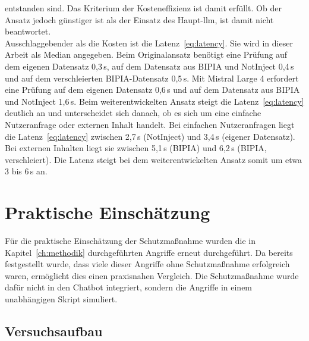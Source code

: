 entstanden sind. Das Kriterium der Kosteneffizienz ist damit erfüllt. Ob der Ansatz jedoch günstiger ist als der Einsatz des Haupt-\ac{llm}, ist damit nicht 
beantwortet. \\
Ausschlaggebender als die Kosten ist die Latenz~\eqref{eq:latency}. Sie wird in dieser Arbeit als Median angegeben. Beim Originalansatz benötigt eine Prüfung auf dem eigenen 
Datensatz 0,3\,s, auf dem Datensatz aus BIPIA und NotInject 0,4\,s und auf dem verschleierten BIPIA-Datensatz 0,5\,s. Mit Mistral Large 4 erfordert eine Prüfung
auf dem eigenen Datensatz 0,6\,s und auf dem Datensatz aus BIPIA und NotInject 1,6\,s.
Beim weiterentwickelten Ansatz steigt die Latenz~\eqref{eq:latency} deutlich an und unterscheidet sich
danach, ob es sich um eine einfache Nutzeranfrage oder externen Inhalt handelt. Bei einfachen Nutzeranfragen liegt die Latenz~\eqref{eq:latency} zwischen 2,7\,s (NotInject) 
und 3,4\,s (eigener Datensatz). Bei externen Inhalten liegt sie zwischen 5,1\,s (BIPIA) und 6,2\,s (BIPIA, verschleiert). Die Latenz steigt bei dem weiterentwickelten Ansatz
somit um etwa 3 bis 6\,s an.

\section{Praktische Einschätzung}

Für die praktische Einschätzung der Schutzmaßnahme wurden die in Kapitel~\ref{ch:methodik} durchgeführten Angriffe erneut durchgeführt. Da bereits festgestellt wurde,
dass viele dieser Angriffe ohne Schutzmaßnahme erfolgreich waren, ermöglicht dies einen praxisnahen Vergleich. Die Schutzmaßnahme wurde dafür nicht in den 
Chatbot integriert, sondern die Angriffe in einem unabhängigen Skript simuliert. 

\subsection{Versuchsaufbau}

